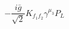 %
\begin{dmath*}
%
  -  \frac{i {\bar g}{}}{\sqrt{2}}K_{f_1 f_2}  \gamma^{\mu_3} P_L
%
\end{dmath*}
%
